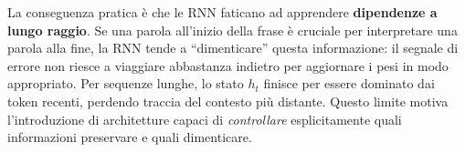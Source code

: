 La conseguenza pratica è che le RNN faticano ad apprendere \textbf{dipendenze a lungo raggio}. Se una parola all'inizio della frase è cruciale per interpretare una parola alla fine, la RNN tende a ``dimenticare'' questa informazione: il segnale di errore non riesce a viaggiare abbastanza indietro per aggiornare i pesi in modo appropriato. Per sequenze lunghe, lo stato $h_t$ finisce per essere dominato dai token recenti, perdendo traccia del contesto più distante.
Questo limite motiva l'introduzione di architetture capaci di \textit{controllare} esplicitamente quali informazioni preservare e quali dimenticare.












